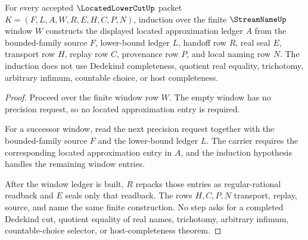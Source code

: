 \begin{theorem}
\label{thm:located-lower-cut-window-induction}
For every accepted $\LocatedLowerCutUp$ packet $K=(F,L,A,W,R,E,H,C,P,N)$, induction over the finite $\StreamNameUp$ window $W$ constructs the displayed located approximation ledger $A$ from the bounded-family source $F$, lower-bound ledger $L$, handoff row $R$, real seal $E$, transport row $H$, replay row $C$, provenance row $P$, and local naming row $N$. The induction does not use Dedekind completeness, quotient real equality, trichotomy, arbitrary infimum, countable choice, or host completeness.
\end{theorem}
\begin{proof}
Proceed over the finite window row $W$. The empty window has no precision request, so no located approximation entry is required.

For a successor window, read the next precision request together with the bounded-family source $F$ and the lower-bound ledger $L$. The carrier requires the corresponding located approximation entry in $A$, and the induction hypothesis handles the remaining window entries.

After the window ledger is built, $R$ repacks those entries as regular-rational readback and $E$ seals only that readback. The rows $H,C,P,N$ transport, replay, source, and name the same finite construction. No step asks for a completed Dedekind cut, quotient equality of real names, trichotomy, arbitrary infimum, countable-choice selector, or host-completeness theorem.
\end{proof}

\begin{closurestatus}{\LocatedLowerCutUp}
  \theoryclosure{\seedClosure}
  \formalstatus{\unformalizedV}
\end{closurestatus}
